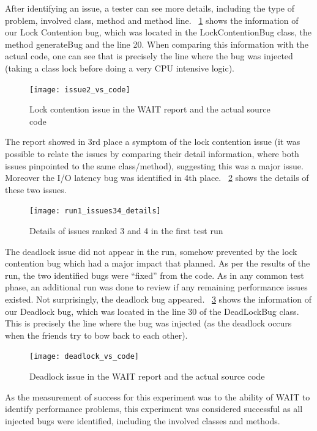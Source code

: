\documentclass[runningheads,a4paper]{llncs}
\begin{document}
After identifying an issue, a tester can see more details, including the type of
problem, involved class, method and method line. \figurename
~\ref{fig_issue2_vs_code} shows the information of our Lock Contention bug,
which was located in the LockContentionBug class, the method generateBug and
the line 20. When comparing this information with the actual code, one can see
that is precisely the line where the bug was injected (taking a class lock
before doing a very CPU intensive logic).
\vspace{-5pt}
\begin{figure}[!h]
\texttt{[image: issue2\_vs\_code]}
\caption{Lock contention issue in the WAIT report and the actual source code}
\label{fig_issue2_vs_code}
\end{figure}
\vspace{-5pt}
The report showed in 3rd place a symptom of the lock contention issue
(it was possible to relate the issues by comparing their detail information,
where both issues pinpointed to the same class/method), suggesting this was a
major issue. Moreover the I/O latency bug was identified in 4th place.
\figurename ~\ref{fig_issues34} shows the details of these two issues.
\vspace{-5pt}
\begin{figure}[!h]
\texttt{[image: run1\_issues34\_details]}
\caption{Details of issues ranked 3 and 4 in the first test run}
\label{fig_issues34}
\end{figure}
\vspace{-5pt}
The deadlock issue did not appear in the run, somehow prevented by the lock
contention bug which had a major impact that planned. As per the results of
the run, the two identified bugs were ``fixed'' from the code. As in any common
test phase, an additional run was done to review if any remaining
performance issues existed. Not surprisingly, the deadlock bug
appeared. \figurename ~\ref{fig_dlissue_vs_code} shows the information of our
Deadlock bug, which was located in the line 30 of the DeadLockBug class. This is
precisely the line where the bug was injected (as the deadlock occurs when
the friends try to bow back to each other).
\vspace{-5pt}
\begin{figure}[!h]
\texttt{[image: deadlock\_vs\_code]}
\caption{Deadlock issue in the WAIT report and the
actual source code}
\label{fig_dlissue_vs_code}
\end{figure}
\vspace{-5pt}
As the measurement of success for this experiment was to the ability of WAIT to
identify performance problems, this experiment was considered successful as all
injected bugs were identified, including the involved classes and methods.
\end{document}
